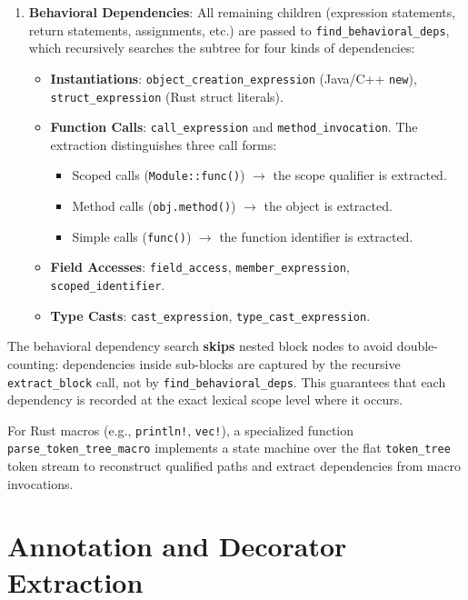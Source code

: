 \begin{enumerate}
  \item \textbf{Behavioral Dependencies}: All remaining children
    (expression statements, return statements, assignments, etc.) are
    passed to \texttt{find\_behavioral\_deps}, which recursively
    searches the subtree for four kinds of dependencies:
    \begin{itemize}
      \item \textbf{Instantiations}:
        \texttt{object\_creation\_expression} (Java/C++
        \texttt{new}), \texttt{struct\_expression} (Rust struct literals).
      \item \textbf{Function Calls}: \texttt{call\_expression} and
        \texttt{method\_invocation}. The extraction distinguishes
        three call forms:
        \begin{itemize}
          \item Scoped calls (\texttt{Module::func()}) $\to$ the
            scope qualifier is extracted.
          \item Method calls (\texttt{obj.method()}) $\to$ the object
            is extracted.
          \item Simple calls (\texttt{func()}) $\to$ the function
            identifier is extracted.
        \end{itemize}
      \item \textbf{Field Accesses}: \texttt{field\_access},
        \texttt{member\_expression}, \texttt{scoped\_identifier}.
      \item \textbf{Type Casts}: \texttt{cast\_expression},
        \texttt{type\_cast\_expression}.
    \end{itemize}
\end{enumerate}

The behavioral dependency search \textbf{skips} nested block nodes to
avoid double-counting: dependencies inside sub-blocks are captured by
the recursive \texttt{extract\_block} call, not by
\texttt{find\_behavioral\_deps}. This guarantees that each dependency
is recorded at the exact lexical scope level where it occurs.

For Rust macros (e.g., \texttt{println!}, \texttt{vec!}), a
specialized function \texttt{parse\_token\_tree\_macro} implements a
state machine over the flat \texttt{token\_tree} token stream to
reconstruct qualified paths and extract dependencies from macro invocations.

\section{Annotation and Decorator Extraction}
\label{sec:annotation_extraction}

